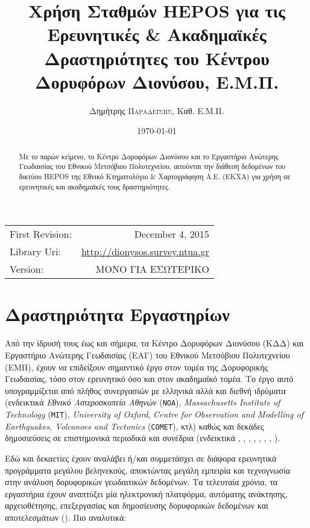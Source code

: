 \documentclass[11pt]{article}
\title{Χρήση Σταθμών HEPOS για τις Ερευνητικές \& Ακαδημαϊκές Δραστηριότητες του Κέντρου Δορυφόρων Διονύσου, Ε.Μ.Π.} %
\author{Δημήτρης \textsc{Παραδείσης}, Καθ. Ε.Μ.Π.}
\date{\today} %
\begin{document}
\maketitle %

\begin{center}
\begin{tabular}{l r}
First Revision: & December 4, 2015 \\
Library Uri:    & \url{http://dionysos.survey.ntua.gr} \\
Version:        & ΜΟΝΟ ΓΙΑ ΕΣΩΤΕΡΙΚΟ
\end{tabular}
\end{center}

\begin{abstract}
{\small 
Με το παρών κείμενο, το Κέντρο Δορυφόρων Διονύσου και το Εργαστήριο Ανώτερης Γεωδαισίας του Εθνικού Μετσόβιου Πολυτεχνείου, αιτούνται την διάθεση δεδομένων του δικτύου HEPOS της Εθνικό Κτηματολόγιο \& Χαρτογράφηση Α.Ε. (ΕΚΧΑ) για χρήση σε ερευνητικές και ακαδημαϊκές τους δραστηριότητες.
}
\end{abstract}
\clearpage

\tableofcontents
\clearpage

\section{Δραστηριότητα Εργαστηρίων}\label{drastiriotita}
Από την ίδρυσή τους έως και σήμερα, τα Κέντρο Δορυφόρων Διονύσου (ΚΔΔ) και Εργαστήριο Ανώτερης Γεωδαισίας (ΕΑΓ) του Εθνικού Μετσόβιου Πολυτεχνείου (ΕΜΠ), έχουν να επιδείξουν σημαντικό έργο στον τομέα της Δορυφορικής Γεωδαισίας, τόσο στον ερευνητικό όσο και στον ακαδημαϊκό τομέα. Το έργο αυτό υπογραμμίζεται από πλήθος συνεργασιών με ελληνικά αλλά και διεθνή ιδρύματα (ενδεικτικά \textit{Εθνικό Αστεροσκοπείο Αθηνών} (\texttt{NOA}), \textit{Massachusetts Institute of Technology} (\texttt{MIT}), \textit{University of Oxford}, \textit{Centre for Observation and Modelling of Earthquakes, Volcanoes and Tectonics} (\texttt{COMET}), κτλ) καθώς και δεκάδες δημοσιεύσεις σε επιστημονικά περιοδικά και συνέδρια (ενδεικτικά \cite{Billiris1991}, \cite{JGRB11137}, \cite{Cocard199939}, \cite{JGRB12107}, \cite{Reilinger201022}, \cite{JGRB16426}, \cite{Parks2012}, \cite{Ganas201362}).

Εδώ και δεκαετίες έχουν αναλάβει ή/και συμμετάσχει σε διάφορα ερευνητικά προγράμματα μεγάλου βεληνεκούς, 
αποκτώντας μεγάλη εμπειρία και τεχνογνωσία στην ανάλυση δορυφορικών γεωδαιτικών δεδομένων. Τα τελευταία 
χρόνια, τα εργαστήρια έχουν αναπτύξει μία ηλεκτρονική πλατφόρμα, αυτόματης ανάκτησης, αρχειοθέτησης, 
επεξεργασίας και δημοσίευσης δορυφορικών δεδομένων και αποτελεσμάτων (\cite{papanikegu}). Πιο αναλυτικά:
\end{document}

